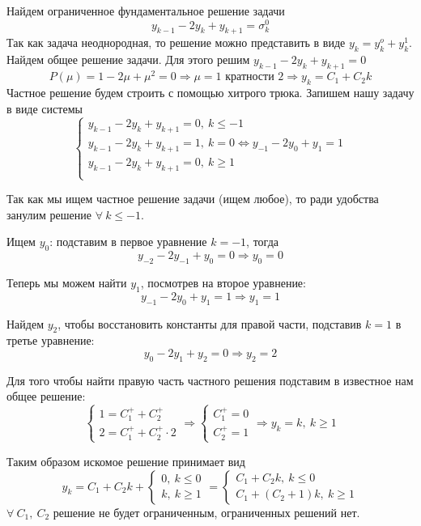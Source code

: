 \begin{task}
  Найдем ограниченное фундаментальное решение задачи
  \[y_{k-1}-2y_k+y_{k+1}=\sigma_k^0\]
  Так как задача неоднородная, то решение можно представить в виде
  $y_k=y_k^o+y_k^1$.
  Найдем общее решение задачи. Для этого решим $y_{k-1}-2y_k+y_{k+1}=0$
  \[P(\mu)=1-2\mu+\mu^2=0\Rightarrow\mu=1\text{ кратности 2}\Rightarrow y_k=C_1+C_2k\]
  Частное решение будем строить с помощью хитрого трюка. Запишем
  нашу задачу в виде системы
  \[\begin{cases}
      y_{k-1}-2y_k+y_{k+1}=0,\ k\leq -1                                  \\
      y_{k-1}-2y_k+y_{k+1}=1,\ k = 0 \Leftrightarrow y_{-1}-2y_0+y_{1}=1 \\
      y_{k-1}-2y_k+y_{k+1}=0,\ k \geq 1                                  \\
    \end{cases}\]

  Так как мы ищем частное решение задачи (ищем любое),
  то ради удобства занулим решение $\forall\ k\leq-1$.

  Ищем $y_0$: подставим в первое уравнение $k=-1$, тогда
  \[y_{-2}-2y_{-1}+y_{0}=0\Rightarrow y_0=0\]

  Теперь мы можем найти $y_1$, посмотрев на второе уравнение:
  \[y_{-1}-2y_0+y_{1}=1\Rightarrow y_1=1\]

  Найдем $y_2$, чтобы восстановить константы для правой части, подставив $k=1$ в третье уравнение:
  \[y_{0}-2y_1+y_{2}=0\Rightarrow y_2=2\]

  Для того чтобы найти правую часть частного решения подставим
  в известное нам общее решение:
  \[\begin{cases}
      1=C_1^++C_2^+ \\
      2=C_1^++C_2^+\cdot2
    \end{cases}\Rightarrow\begin{cases}
      C_1^+=0 \\
      C_2^+=1
    \end{cases}\Rightarrow y_k=k,\ k\geq1\]

  Таким образом искомое решение принимает вид
  \[y_k=C_1+C_2k + \begin{cases}
      0,\ k\leq 0 \\
      k,\ k\geq1
    \end{cases}= \begin{cases}
      C_1+C_2k,\ k\leq 0 \\
      C_1+(C_2+1)k,\ k\geq1
    \end{cases}\]
  $\forall\ C_1,\ C_2$ решение не будет ограниченным, ограниченных решений нет.
\end{task}
